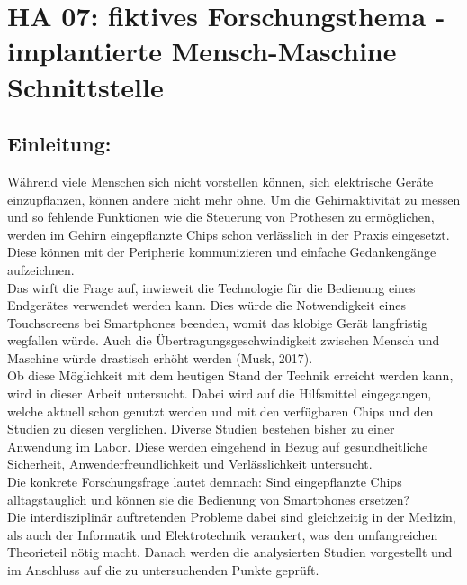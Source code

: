 \section{HA 07: fiktives Forschungsthema - implantierte Mensch-Maschine Schnittstelle}
\subsection{Einleitung:}
  Während viele Menschen sich nicht vorstellen können, sich elektrische Geräte einzupflanzen, können andere nicht mehr ohne. Um die Gehirnaktivität zu messen und so fehlende Funktionen wie die Steuerung von Prothesen zu ermöglichen, werden im Gehirn eingepflanzte Chips schon verlässlich in der Praxis eingesetzt. Diese können mit der Peripherie kommunizieren und einfache Gedankengänge aufzeichnen.\\
  Das wirft die Frage auf, inwieweit die Technologie für die Bedienung eines Endgerätes verwendet werden kann. Dies würde die Notwendigkeit eines Touchscreens bei Smartphones beenden, womit das klobige Gerät langfristig wegfallen würde. Auch die Übertragungsgeschwindigkeit zwischen Mensch und Maschine würde drastisch erhöht werden (Musk, 2017). \\
  Ob diese Möglichkeit mit dem heutigen Stand der Technik erreicht werden kann, wird in dieser Arbeit untersucht. Dabei wird auf die Hilfsmittel eingegangen, welche aktuell schon genutzt werden und mit den verfügbaren Chips und den Studien zu diesen verglichen. Diverse Studien bestehen bisher zu einer Anwendung im Labor. Diese werden eingehend in Bezug auf gesundheitliche Sicherheit, Anwenderfreundlichkeit und Verlässlichkeit untersucht.\\
  Die konkrete Forschungsfrage lautet demnach:
  Sind eingepflanzte Chips alltagstauglich und können sie die Bedienung von Smartphones ersetzen?\\
  Die interdisziplinär auftretenden Probleme dabei sind gleichzeitig in der Medizin, als auch der Informatik und Elektrotechnik verankert, was den umfangreichen Theorieteil nötig macht. Danach werden die analysierten Studien vorgestellt und im Anschluss auf die zu untersuchenden Punkte geprüft.\\

